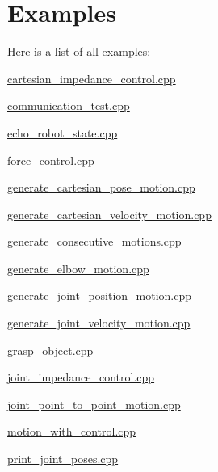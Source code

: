 \section{Examples}
Here is a list of all examples\+:\begin{DoxyCompactItemize}
\item 
\hyperlink{cartesian_impedance_control_8cpp-example}{cartesian\+\_\+impedance\+\_\+control.\+cpp}
\item 
\hyperlink{communication_test_8cpp-example}{communication\+\_\+test.\+cpp}
\item 
\hyperlink{echo_robot_state_8cpp-example}{echo\+\_\+robot\+\_\+state.\+cpp}
\item 
\hyperlink{force_control_8cpp-example}{force\+\_\+control.\+cpp}
\item 
\hyperlink{generate_cartesian_pose_motion_8cpp-example}{generate\+\_\+cartesian\+\_\+pose\+\_\+motion.\+cpp}
\item 
\hyperlink{generate_cartesian_velocity_motion_8cpp-example}{generate\+\_\+cartesian\+\_\+velocity\+\_\+motion.\+cpp}
\item 
\hyperlink{generate_consecutive_motions_8cpp-example}{generate\+\_\+consecutive\+\_\+motions.\+cpp}
\item 
\hyperlink{generate_elbow_motion_8cpp-example}{generate\+\_\+elbow\+\_\+motion.\+cpp}
\item 
\hyperlink{generate_joint_position_motion_8cpp-example}{generate\+\_\+joint\+\_\+position\+\_\+motion.\+cpp}
\item 
\hyperlink{generate_joint_velocity_motion_8cpp-example}{generate\+\_\+joint\+\_\+velocity\+\_\+motion.\+cpp}
\item 
\hyperlink{grasp_object_8cpp-example}{grasp\+\_\+object.\+cpp}
\item 
\hyperlink{joint_impedance_control_8cpp-example}{joint\+\_\+impedance\+\_\+control.\+cpp}
\item 
\hyperlink{joint_point_to_point_motion_8cpp-example}{joint\+\_\+point\+\_\+to\+\_\+point\+\_\+motion.\+cpp}
\item 
\hyperlink{motion_with_control_8cpp-example}{motion\+\_\+with\+\_\+control.\+cpp}
\item 
\hyperlink{print_joint_poses_8cpp-example}{print\+\_\+joint\+\_\+poses.\+cpp}
\end{DoxyCompactItemize}
